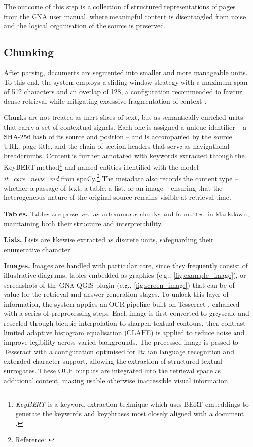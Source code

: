 \begin{spacing}{1.5}
The outcome of this step is a collection of structured representations of pages from the GNA user manual, where meaningful content is disentangled from noise and the logical organisation of the source is preserved.


\subsection{Chunking}
After parsing, documents are segmented into smaller and more manageable units. To this end, the system employs a sliding-window strategy with a maximum span of 512 characters and an overlap of 128, a configuration recommended to favour dense retrieval while mitigating excessive fragmentation of context \citep{wang_searching_2024}.

Chunks are not treated as inert slices of text, but as semantically enriched units that carry a set of contextual signals. Each one is assigned a unique identifier -- a SHA-256 hash of its source and position -- and is accompanied by the source URL, page title, and the chain of section headers that serve as navigational breadcrumbs. Content is further annotated with keywords extracted through the KeyBERT method\footnote{\textit{KeyBERT} is a keyword extraction technique which uses BERT embeddings to generate the keywords and keyphrases most closely aligned with a document \citep{grootendorst_maartengrkeybert_2025}.} and named entities identified with the model \textit{it\_core\_news\_md} from spaCy.\footnote{Reference: \textcite{noauthor_release_2024}} The metadata also records the content type -- whether a passage of text, a table, a list, or an image -- ensuring that the heterogeneous nature of the original source remains visible at retrieval time.

\textbf{Tables. }Tables are preserved as autonomous chunks and formatted in Markdown, maintaining both their structure and interpretability. 

\textbf{Lists. }Lists are likewise extracted as discrete units, safeguarding their enumerative character. 

\textbf{Images. }Images are handled with particular care, since they frequently consist of illustrative diagrams, tables embedded as graphics (e.g., \autoref{fig:example_image}), or screenshots of the GNA QGIS plugin (e.g., \autoref{fig:screen_image}) that can be of value for the retrieval and answer generation stages. To unlock this layer of information, the system applies an OCR pipeline built on Tesseract \citep{noauthor_tesseract_2025}, enhanced with a series of preprocessing steps. Each image is first converted to greyscale and rescaled through bicubic interpolation to sharpen textual contours, then contrast-limited adaptive histogram equalisation (CLAHE) is applied to reduce noise and improve legibility across varied backgrounds. The processed image is passed to Tesseract with a configuration optimised for Italian language recognition and extended character support, allowing the extraction of structured textual surrogates. These OCR outputs are integrated into the retrieval space as additional content, making usable otherwise inaccessible visual information.


\end{spacing}

